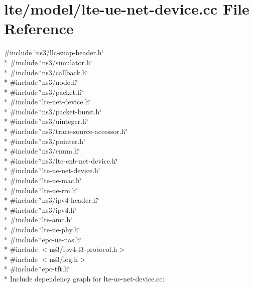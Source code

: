\hypertarget{lte-ue-net-device_8cc}{}\section{lte/model/lte-\/ue-\/net-\/device.cc File Reference}
\label{lte-ue-net-device_8cc}
{\ttfamily \#include \char`\"{}ns3/llc-\/snap-\/header.\+h\char`\"{}}\\*
{\ttfamily \#include \char`\"{}ns3/simulator.\+h\char`\"{}}\\*
{\ttfamily \#include \char`\"{}ns3/callback.\+h\char`\"{}}\\*
{\ttfamily \#include \char`\"{}ns3/node.\+h\char`\"{}}\\*
{\ttfamily \#include \char`\"{}ns3/packet.\+h\char`\"{}}\\*
{\ttfamily \#include \char`\"{}lte-\/net-\/device.\+h\char`\"{}}\\*
{\ttfamily \#include \char`\"{}ns3/packet-\/burst.\+h\char`\"{}}\\*
{\ttfamily \#include \char`\"{}ns3/uinteger.\+h\char`\"{}}\\*
{\ttfamily \#include \char`\"{}ns3/trace-\/source-\/accessor.\+h\char`\"{}}\\*
{\ttfamily \#include \char`\"{}ns3/pointer.\+h\char`\"{}}\\*
{\ttfamily \#include \char`\"{}ns3/enum.\+h\char`\"{}}\\*
{\ttfamily \#include \char`\"{}ns3/lte-\/enb-\/net-\/device.\+h\char`\"{}}\\*
{\ttfamily \#include \char`\"{}lte-\/ue-\/net-\/device.\+h\char`\"{}}\\*
{\ttfamily \#include \char`\"{}lte-\/ue-\/mac.\+h\char`\"{}}\\*
{\ttfamily \#include \char`\"{}lte-\/ue-\/rrc.\+h\char`\"{}}\\*
{\ttfamily \#include \char`\"{}ns3/ipv4-\/header.\+h\char`\"{}}\\*
{\ttfamily \#include \char`\"{}ns3/ipv4.\+h\char`\"{}}\\*
{\ttfamily \#include \char`\"{}lte-\/amc.\+h\char`\"{}}\\*
{\ttfamily \#include \char`\"{}lte-\/ue-\/phy.\+h\char`\"{}}\\*
{\ttfamily \#include \char`\"{}epc-\/ue-\/nas.\+h\char`\"{}}\\*
{\ttfamily \#include $<$ns3/ipv4-\/l3-\/protocol.\+h$>$}\\*
{\ttfamily \#include $<$ns3/log.\+h$>$}\\*
{\ttfamily \#include \char`\"{}epc-\/tft.\+h\char`\"{}}\\*
Include dependency graph for lte-\/ue-\/net-\/device.cc\+:
